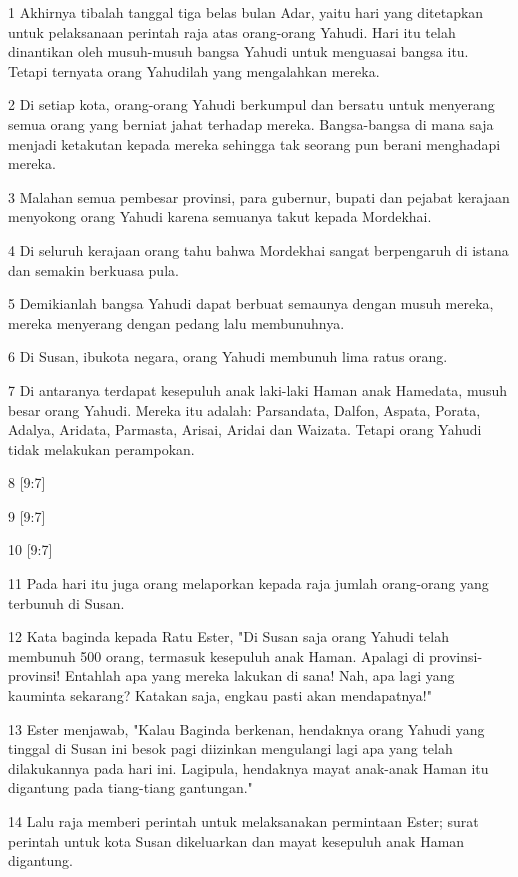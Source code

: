 \par 1 Akhirnya tibalah tanggal tiga belas bulan Adar, yaitu hari yang ditetapkan untuk pelaksanaan perintah raja atas orang-orang Yahudi. Hari itu telah dinantikan oleh musuh-musuh bangsa Yahudi untuk menguasai bangsa itu. Tetapi ternyata orang Yahudilah yang mengalahkan mereka.
\par 2 Di setiap kota, orang-orang Yahudi berkumpul dan bersatu untuk menyerang semua orang yang berniat jahat terhadap mereka. Bangsa-bangsa di mana saja menjadi ketakutan kepada mereka sehingga tak seorang pun berani menghadapi mereka.
\par 3 Malahan semua pembesar provinsi, para gubernur, bupati dan pejabat kerajaan menyokong orang Yahudi karena semuanya takut kepada Mordekhai.
\par 4 Di seluruh kerajaan orang tahu bahwa Mordekhai sangat berpengaruh di istana dan semakin berkuasa pula.
\par 5 Demikianlah bangsa Yahudi dapat berbuat semaunya dengan musuh mereka, mereka menyerang dengan pedang lalu membunuhnya.
\par 6 Di Susan, ibukota negara, orang Yahudi membunuh lima ratus orang.
\par 7 Di antaranya terdapat kesepuluh anak laki-laki Haman anak Hamedata, musuh besar orang Yahudi. Mereka itu adalah: Parsandata, Dalfon, Aspata, Porata, Adalya, Aridata, Parmasta, Arisai, Aridai dan Waizata. Tetapi orang Yahudi tidak melakukan perampokan.
\par 8 [9:7]
\par 9 [9:7]
\par 10 [9:7]
\par 11 Pada hari itu juga orang melaporkan kepada raja jumlah orang-orang yang terbunuh di Susan.
\par 12 Kata baginda kepada Ratu Ester, "Di Susan saja orang Yahudi telah membunuh 500 orang, termasuk kesepuluh anak Haman. Apalagi di provinsi-provinsi! Entahlah apa yang mereka lakukan di sana! Nah, apa lagi yang kauminta sekarang? Katakan saja, engkau pasti akan mendapatnya!"
\par 13 Ester menjawab, "Kalau Baginda berkenan, hendaknya orang Yahudi yang tinggal di Susan ini besok pagi diizinkan mengulangi lagi apa yang telah dilakukannya pada hari ini. Lagipula, hendaknya mayat anak-anak Haman itu digantung pada tiang-tiang gantungan."
\par 14 Lalu raja memberi perintah untuk melaksanakan permintaan Ester; surat perintah untuk kota Susan dikeluarkan dan mayat kesepuluh anak Haman digantung.
